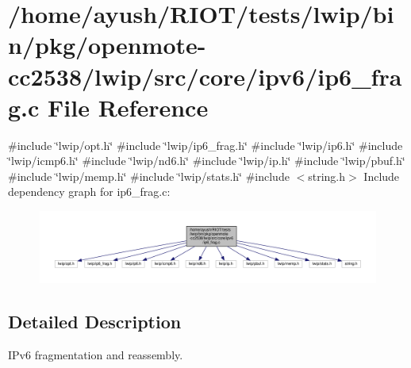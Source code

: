 \hypertarget{openmote-cc2538_2lwip_2src_2core_2ipv6_2ip6__frag_8c}{}\section{/home/ayush/\+R\+I\+O\+T/tests/lwip/bin/pkg/openmote-\/cc2538/lwip/src/core/ipv6/ip6\+\_\+frag.c File Reference}
\label{openmote-cc2538_2lwip_2src_2core_2ipv6_2ip6__frag_8c}
{\ttfamily \#include \char`\"{}lwip/opt.\+h\char`\"{}}\newline
{\ttfamily \#include \char`\"{}lwip/ip6\+\_\+frag.\+h\char`\"{}}\newline
{\ttfamily \#include \char`\"{}lwip/ip6.\+h\char`\"{}}\newline
{\ttfamily \#include \char`\"{}lwip/icmp6.\+h\char`\"{}}\newline
{\ttfamily \#include \char`\"{}lwip/nd6.\+h\char`\"{}}\newline
{\ttfamily \#include \char`\"{}lwip/ip.\+h\char`\"{}}\newline
{\ttfamily \#include \char`\"{}lwip/pbuf.\+h\char`\"{}}\newline
{\ttfamily \#include \char`\"{}lwip/memp.\+h\char`\"{}}\newline
{\ttfamily \#include \char`\"{}lwip/stats.\+h\char`\"{}}\newline
{\ttfamily \#include $<$string.\+h$>$}\newline
Include dependency graph for ip6\+\_\+frag.\+c\+:
\nopagebreak
\begin{figure}[H]
\begin{center}
\leavevmode
\includegraphics[width=350pt]{openmote-cc2538_2lwip_2src_2core_2ipv6_2ip6__frag_8c__incl}
\end{center}
\end{figure}


\subsection{Detailed Description}
I\+Pv6 fragmentation and reassembly. 